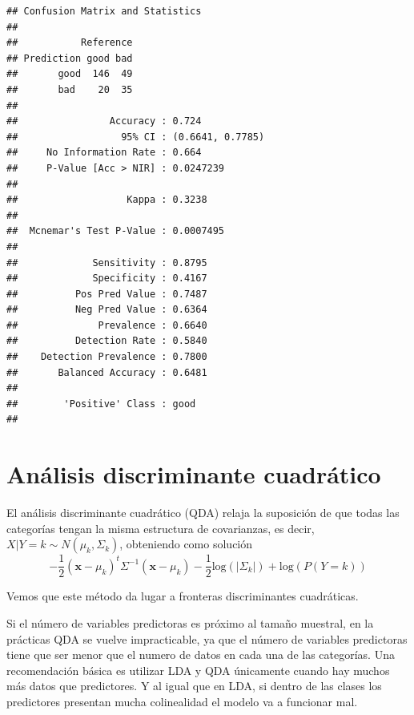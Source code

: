 \documentclass[
]{book}
\newenvironment{Shaded}{\begin{snugshade}}{\end{snugshade}}
\newcommand{\NormalTok}[1]{#1}
\newcommand{\OperatorTok}[1]{\textcolor[rgb]{0.81,0.36,0.00}{\textbf{#1}}}
\theoremstyle{break}
\theoremstyle{definition}
\theoremstyle{definition}
\theoremstyle{definition}
\theoremstyle{remark}
\begin{document}
\begin{verbatim}
## Confusion Matrix and Statistics
## 
##           Reference
## Prediction good bad
##       good  146  49
##       bad    20  35
##                                           
##                Accuracy : 0.724           
##                  95% CI : (0.6641, 0.7785)
##     No Information Rate : 0.664           
##     P-Value [Acc > NIR] : 0.0247239       
##                                           
##                   Kappa : 0.3238          
##                                           
##  Mcnemar's Test P-Value : 0.0007495       
##                                           
##             Sensitivity : 0.8795          
##             Specificity : 0.4167          
##          Pos Pred Value : 0.7487          
##          Neg Pred Value : 0.6364          
##              Prevalence : 0.6640          
##          Detection Rate : 0.5840          
##    Detection Prevalence : 0.7800          
##       Balanced Accuracy : 0.6481          
##                                           
##        'Positive' Class : good            
## 
\end{verbatim}

\begin{Shaded}
\end{Shaded}

\hypertarget{anuxe1lisis-discriminante-cuadruxe1tico}{%
\section{Análisis discriminante cuadrático}\label{anuxe1lisis-discriminante-cuadruxe1tico}}

El análisis discriminante cuadrático (QDA) relaja la suposición de que todas las categorías tengan la misma estructura de covarianzas, es decir, \(X | Y = k \sim N(\mu_k, \Sigma_k)\), obteniendo como solución
\[-\frac{1}{2} (\mathbf{x} - \mu_k)^t \Sigma^{-1} (\mathbf{x} - \mu_k) - \frac{1}{2} \mbox{log}(|\Sigma_k|) + \mbox{log}(P(Y = k))
\]

Vemos que este método da lugar a fronteras discriminantes cuadráticas.

Si el número de variables predictoras es próximo al tamaño muestral, en la prácticas QDA se vuelve impracticable, ya que el número de variables predictoras tiene que ser menor que el numero de datos en cada una de las categorías. Una recomendación básica es utilizar LDA y QDA únicamente cuando hay muchos más datos que predictores. Y al igual que en LDA, si dentro de las clases los predictores presentan mucha colinealidad el modelo va a funcionar mal.
\end{document}
